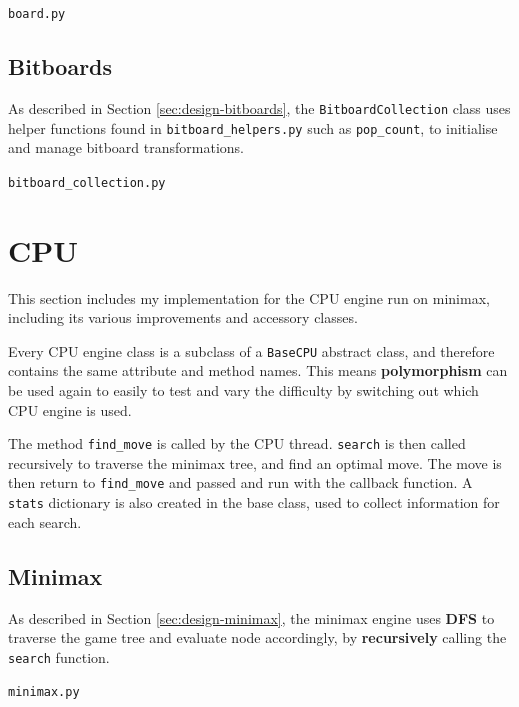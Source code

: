 \documentclass[../main/main.tex]{subfiles}
\begin{document}
\noindent\verb|board.py|


\subsection{Bitboards}
\label{sec:bitboards}
As described in Section \ref{sec:design-bitboards}, the \lstinline{BitboardCollection} class uses helper functions found in \lstinline{bitboard_helpers.py} such as \lstinline{pop_count}, to initialise and manage bitboard transformations.

\noindent\verb|bitboard_collection.py|


\section{CPU}
This section includes my implementation for the CPU engine run on minimax, including its various improvements and accessory classes.

Every CPU engine class is a subclass of a \lstinline{BaseCPU} abstract class, and therefore contains the same attribute and method names. This means \textbf{polymorphism} can be used again to easily to test and vary the difficulty by switching out which CPU engine is used.

The method \lstinline{find_move} is called by the CPU thread. \lstinline{search} is then called recursively to traverse the minimax tree, and find an optimal move. The move is then return to \lstinline{find_move} and passed and run with the callback function. A \lstinline{stats} dictionary is also created in the base class, used to collect information for each search.

\subsection{Minimax}
\label{sec:minimax}
As described in Section \ref{sec:design-minimax}, the minimax engine uses \textbf{DFS} to traverse the game tree and evaluate node accordingly, by \textbf{recursively} calling the \lstinline{search} function.

\noindent\verb|minimax.py|

\end{document}
